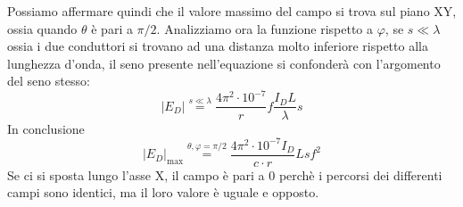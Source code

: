 Possiamo affermare quindi che il valore massimo del campo si trova sul piano XY, ossia quando
$\theta$ è pari a $\pi/2$.
Analizziamo ora la funzione rispetto a $\varphi$, se $s\ll\lambda$ ossia i due conduttori
si trovano ad una distanza molto inferiore rispetto alla lunghezza d'onda, il seno presente nell'equazione
si confonderà con l'argomento del seno stesso:
$$
\left|E_D\right| \stackrel{s\ll\lambda}{=} \frac{4\pi^2\cdot10^{-7}}{r}f\frac{I_D L}{\lambda}s  
$$
In conclusione
$$
\left|E_D \right|_{\text{max}} \stackrel{\theta,\varphi = \pi/2}{=} \frac{4\pi^2\cdot10^{-7}I_D}{c\cdot r}Lsf^2
$$
Se ci si sposta lungo l'asse X, il campo è pari a 0 perchè i percorsi dei differenti campi sono identici,
ma il loro valore è uguale e opposto.

